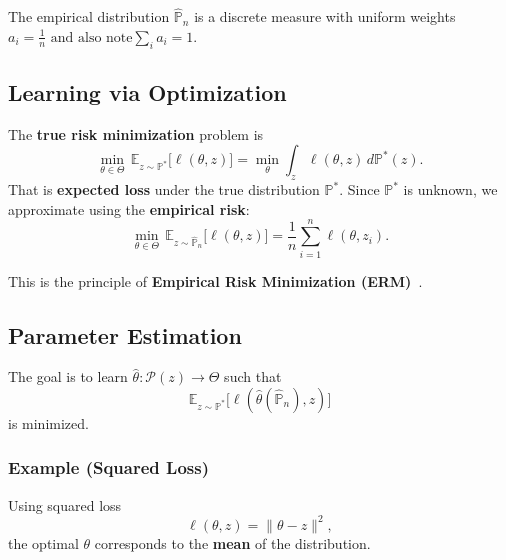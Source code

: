 \documentclass[11pt]{report}
\begin{document}
The empirical distribution $\hat{\mathbb{P}}_n$ is a discrete measure with uniform weights $a_i = \tfrac{1}{n} \text{ and also note} \sum_{i} a_i = 1$.

\subsection{Learning via Optimization}
The \textbf{true risk minimization} problem is
\[
    \min_{\theta \in \Theta} \, \mathbb{E}_{z \sim \mathbb{P^*}} \big[ \ell(\theta, z) \big] 
    = \min_{\theta} \int_z \ell(\theta, z) \, d\mathbb{P^*}(z).
\]
That is \textbf{expected loss} under the true distribution $\mathbb{P^*}$.
Since $\mathbb{P^*}$ is unknown, we approximate using the \textbf{empirical risk}:
\[
    \min_{\theta \in \Theta} \, \mathbb{E}_{z \sim \hat{\mathbb{P}}_n} \big[ \ell(\theta, z) \big] 
    = \frac{1}{n} \sum_{i=1}^n \ell(\theta, z_i).
\]

This is the principle of \textbf{Empirical Risk Minimization (ERM)}~\cite{uml}.

\subsection{Parameter Estimation}
The goal is to learn $\hat{\theta} : \mathcal{P}(z) \to \Theta$ such that
\[
    \mathbb{E}_{z \sim \mathbb{P^*}} \big[ \ell(\hat{\theta}(\hat{\mathbb{P}}_n), z) \big]
\]
is minimized.

\subsubsection{Example (Squared Loss)}
Using squared loss 
\[
    \ell(\theta, z) = \|\theta - z\|^2,
\]
the optimal $\theta$ corresponds to the \textbf{mean} of the distribution. 
\end{document}
